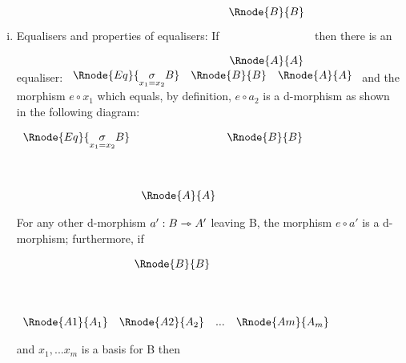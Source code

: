 \documentclass[10pt,a4paper]{scrartcl}
\begin{document}
\begin{enumerate} [(i)]
\item Equalisers and properties of equalisers: If
\setlength{\arraycolsep}{1cm}
$
\begin{array}{c}
\Rnode{B}{B} \\ [1.1cm]
\Rnode{A}{A} \\
\end{array}
$
then there is an equaliser:
\setlength{\arraycolsep}{.75cm}
$
\begin{array}{ccc}
\Rnode{Eq}{\underset{x_1=x_2}{\sigma}B} & \Rnode{B}{B}  & \Rnode{A}{A} \\
\end{array}
$
\noindent and the morphism $e \circ x_1$ which equals, by definition, $e \circ a_2$  is a d-morphism as shown
in the following diagram:
\vspace{.2cm}
\begin{center}
\setlength{\arraycolsep}{.3cm}
$
\begin{array}{ccc}
\Rnode{Eq}{\underset{x_1=x_2}{\sigma}B} & &\Rnode{B}{B} \\[1.4cm]
 & \Rnode{A}{A} &\\
\end{array}
$
\end{center}

\noindent For any other d-morphism $a':B\rightarrowtriangle A'$ leaving B, the morphism $e \circ a'$ is a d-morphism; furthermore, if
\begin{center}
\setlength{\arraycolsep}{.1cm}
$
\begin{array}{ccp{.3cm}c}
                  & \multicolumn{2}{c}{\Rnode{B}{B}}& \\ [1.4cm]
\Rnode{A1}{A_1} &\Rnode{A2}{A_2}& ... & \Rnode{Am}{A_m}\\
\end{array}
$
\end{center}
and $x_1,...x_m$ is a basis for B 
then


\end{enumerate}
\end{document}
